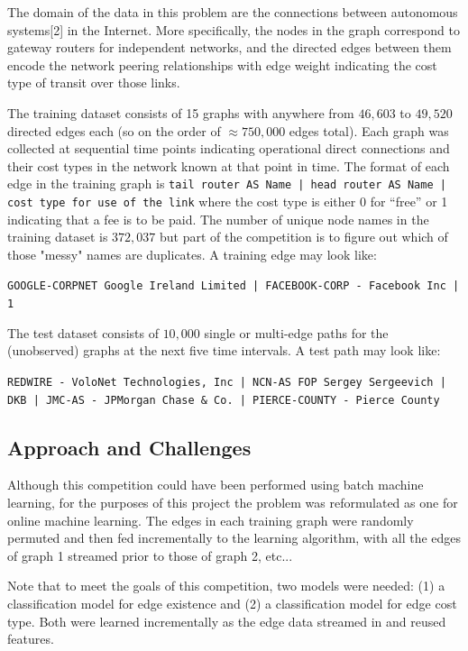 \documentclass{article} %
\begin{document}
The domain of the data in this problem are the connections between
autonomous systems[2] in the Internet.  More specifically, the nodes in the
graph correspond to gateway routers for independent networks, and the directed
edges between them encode the network peering relationships with edge weight
indicating the cost type of
transit over those links.

The training dataset consists of 15 graphs with anywhere from $46,603$ to $49,520$ directed edges each (so on the
order of $\approx 750,000$ edges total).  Each graph was collected at sequential time
points indicating operational direct connections and their cost types in the
network known at that point in time.  The format of each edge in the
training graph is \texttt{tail router AS Name | head router AS
  Name | cost type for use of the link} where the cost type is either 0 for ``free'' or 1
indicating that a fee is to be paid.  The number of unique node names in the
training dataset is $372,037$ but part of the competition is to figure out
which of those "messy" names are duplicates.  A training edge may look like:

\texttt{{\small GOOGLE-CORPNET Google Ireland Limited | FACEBOOK-CORP - Facebook Inc | 1}}

The test dataset consists of $10,000$ single or multi-edge paths for the (unobserved)
graphs at the next five time intervals.  A test path may look like:

\texttt{{\small REDWIRE - VoloNet Technologies, Inc | NCN-AS FOP Sergey Sergeevich | DKB | JMC-AS - JPMorgan Chase \& Co. | PIERCE-COUNTY - Pierce County}}

\subsection{Approach and Challenges}

Although this competition could have been performed using batch machine
learning, for the purposes of this project the problem was reformulated as
one for online machine learning.  The edges in each training graph were
randomly permuted and then fed incrementally to the learning algorithm, with
all the edges of graph 1 streamed prior to those of graph 2, etc...

Note that to meet the goals of this competition, two models were needed: (1)
a classification model for edge existence and (2) a classification model for
edge cost type.  Both were learned incrementally as the edge data streamed in
and reused features.
\end{document}
